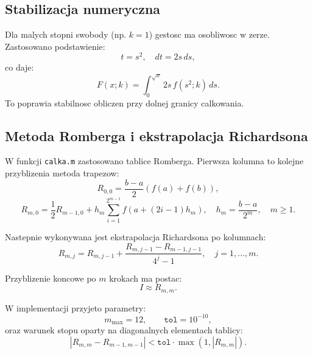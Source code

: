 \documentclass[12pt,a4paper]{article}
\begin{document}
\subsection{Stabilizacja numeryczna}
Dla malych stopni swobody (np. $k=1$) gestosc ma osobliwosc w zerze.
Zastosowano podstawienie:
\begin{equation}
  t = s^2, \quad dt = 2s\,ds,
\end{equation}
co daje:
\begin{equation}
  F(x;k) = \int_0^{\sqrt{x}} 2s\,f(s^2;k)\,ds.
\end{equation}
To poprawia stabilnosc obliczen przy dolnej granicy calkowania.

\subsection{Metoda Romberga i ekstrapolacja Richardsona}
W funkcji \texttt{calka.m} zastosowano tablice Romberga. Pierwsza kolumna
to kolejne przyblizenia metoda trapezow:
\begin{equation}
  R_{0,0} = \frac{b-a}{2}\left(f(a)+f(b)\right),
\end{equation}
\begin{equation}
  R_{m,0} = \frac{1}{2}R_{m-1,0} + h_m\sum_{i=1}^{2^{m-1}} f\!\left(a + (2i-1)h_m\right),
  \quad h_m = \frac{b-a}{2^m}, \quad m \ge 1.
\end{equation}

Nastepnie wykonywana jest ekstrapolacja Richardsona po kolumnach:
\begin{equation}
  R_{m,j} = R_{m,j-1} + \frac{R_{m,j-1}-R_{m-1,j-1}}{4^j-1},
  \quad j=1,\dots,m.
\end{equation}

Przyblizenie koncowe po $m$ krokach ma postac:
\begin{equation}
  I \approx R_{m,m}.
\end{equation}

W implementacji przyjeto parametry:
\begin{equation}
  m_{\max}=12, \qquad \texttt{tol}=10^{-10},
\end{equation}
oraz warunek stopu oparty na diagonalnych elementach tablicy:
\begin{equation}
  \left|R_{m,m}-R_{m-1,m-1}\right| < \texttt{tol}\cdot\max\left(1,\left|R_{m,m}\right|\right).
\end{equation}
\end{document}
